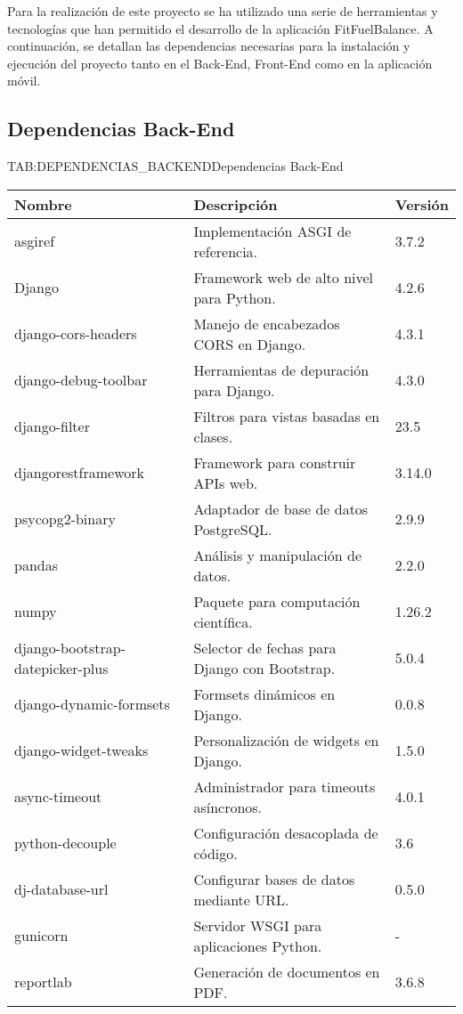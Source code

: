 Para la realización de este proyecto se ha utilizado una serie de herramientas y tecnologías que han permitido el desarrollo de la aplicación FitFuelBalance. A continuación, se detallan las dependencias necesarias para la instalación y ejecución del proyecto tanto en el Back-End, Front-End como en la aplicación móvil.

\subsection{Dependencias Back-End}

\begin{table}[Dependencias Back-End]{TAB:DEPENDENCIAS_BACKEND}{Dependencias Back-End}
  \begin{tabular}{|p{6cm}|p{8cm}|p{2cm}|}
    \hline
    \textbf{Nombre} & \textbf{Descripción} & \textbf{Versión} \\
    \hline
    asgiref & Implementación ASGI de referencia. & 3.7.2 \\
    \hline
    Django & Framework web de alto nivel para Python. & 4.2.6 \\
    \hline
    django-cors-headers & Manejo de encabezados CORS en Django. & 4.3.1 \\
    \hline
    django-debug-toolbar & Herramientas de depuración para Django. & 4.3.0 \\
    \hline
    django-filter & Filtros para vistas basadas en clases. & 23.5 \\
    \hline
    djangorestframework & Framework para construir APIs web. & 3.14.0 \\
    \hline
    psycopg2-binary & Adaptador de base de datos PostgreSQL. & 2.9.9 \\
    \hline
    pandas & Análisis y manipulación de datos. & 2.2.0 \\
    \hline
    numpy & Paquete para computación científica. & 1.26.2 \\
    \hline
    django-bootstrap-datepicker-plus & Selector de fechas para Django con Bootstrap. & 5.0.4 \\
    \hline
    django-dynamic-formsets & Formsets dinámicos en Django. & 0.0.8 \\
    \hline
    django-widget-tweaks & Personalización de widgets en Django. & 1.5.0 \\
    \hline
    async-timeout & Administrador para timeouts asíncronos. & 4.0.1 \\
    \hline
    python-decouple & Configuración desacoplada de código. & 3.6 \\
    \hline
    dj-database-url & Configurar bases de datos mediante URL. & 0.5.0 \\
    \hline
    gunicorn & Servidor WSGI para aplicaciones Python. & - \\
    \hline
    reportlab & Generación de documentos en PDF. & 3.6.8 \\
    \hline
  \end{tabular}
\end{table}

